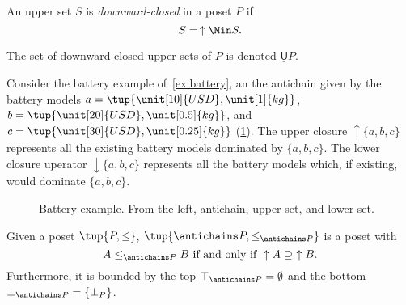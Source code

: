 \begin{definition}
\label{def:downward-closed-upperset}
An upper set $S$ is \emph{downward-closed} in a poset $P$ if
\begin{equation}
    S =\, \uparrow \Min S.
\end{equation}
\end{definition}
\begin{remark}
The set of downward-closed upper sets of $P$ is denoted $\underline{\mathsf{U}}P$.
\end{remark}

\begin{example}
Consider the battery example of~\cref{ex:battery}, an the antichain given by the battery models $a=\tup{\unit[10]{USD},\unit[1]{kg}}$, $b=\tup{\unit[20]{USD},\unit[0.5]{kg}}$, and $c=\tup{\unit[30]{USD},\unit[0.25]{kg}}$ (\cref{fig:examplebatt}).
The upper closure $\uparrow \{a,b,c\}$ represents all the existing battery models dominated by $\{a,b,c\}$. The lower closure uperator $\downarrow\{a,b,c\}$ represents all the battery models which, if existing, would dominate $\{a,b,c\}$.
\begin{figure}[h!]
\begin{center}
\end{center}
\caption{Battery example. From the left, antichain, upper set, and lower set. \label{fig:examplebatt}}
\end{figure}
\end{example}

\begin{lemma}
Given a poset $\tup{P,\leq}$, $\tup{\antichains P,\leq_{\antichains P}}$ is a poset with
\begin{equation}
\label{eq:orderantichain}
    A\leq_{\antichains P} B \text{ if and only if } \uparrow A \supseteq \ \uparrow B.
\end{equation}
Furthermore, it is bounded by the top $\top_{\antichains P}=\emptyset$ and the bottom $\bot_{\antichains P}=\{\bot_P\}$.
\end{lemma}

